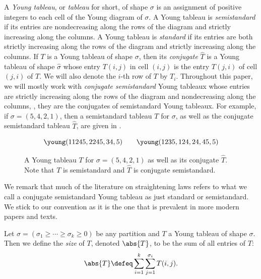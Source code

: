 \documentclass[letterpaper, 11pt]{amsart}
\begin{document}
\begin{defn}\label{defn:tableau}
    A \emph{Young tableau}, or \emph{tableau} for short, of shape $\sigma$ is an assignment of positive integers to each cell of the Young diagram of $\sigma$.
    A Young tableau is \emph{semistandard} if its entries are nondecreasing along the rows of the diagram and strictly increasing along the columns.
    A Young tableau is \emph{standard} if its entries are both strictly increasing along the rows of the diagram and strictly increasing along the columns.
    If $T$ is a Young tableau of shape $\sigma$, then its \emph{conjugate} $\widehat{T}$ is a Young tableau of shape $\widehat{\sigma}$ whose entry $T(i, j)$ in cell $(i, j)$ is the entry $T(j, i)$ of cell $(j, i)$ of $T$.
    We will also denote the $i$-th row of $T$ by $T_i$.
    Throughout this paper, we will mostly work with \emph{conjugate semistandard} Young tableaux whose entries are strictly increasing along the rows of the diagram and nondecreasing along the columns, \ie, they are the conjugates of semistandard Young tableaux.
    For example, if $\sigma = (5, 4, 2, 1)$, then a semistandard tableau $T$ for $\sigma$, as well as the conjugate semistandard tableau $\widehat{T}$, are given in .
    
    \begin{figure}[H]
        \centering
        \[
            \young(11245,2245,34,5) \qquad \young(1235,124,24,45,5)
        \]
        \caption{
            A Young tableau $T$ for $\sigma = (5, 4, 2, 1)$ as well as its conjugate $\widehat{T}$.
            Note that $T$ is semistandard and $\widehat{T}$ is conjugate semistandard.
        }\label{fig:young_tableau_ex}
    \end{figure}
    We remark that much of the literature on straightening laws refers to what we call a conjugate semistandard Young tableau as just standard or semistandard.
    We stick to our convention as it is the one that is prevalent in more modern papers and texts.
\end{defn}

\begin{defn}\label{defn:size_of_tab}
    Let $\sigma = (\sigma_1 \geq \cdots \geq \sigma_k \geq 0)$ be any partition and $T$ a Young tableau of shape $\sigma$.
    Then we define the \emph{size} of $T$, denoted $\abs{T}$, to be the sum of all entries of $T$:
    \[
        \abs{T} \defeq \sum_{i = 1}^k \sum_{j = 1}^{\sigma_i} T(i, j).
    \]
\end{defn}
\end{document}
